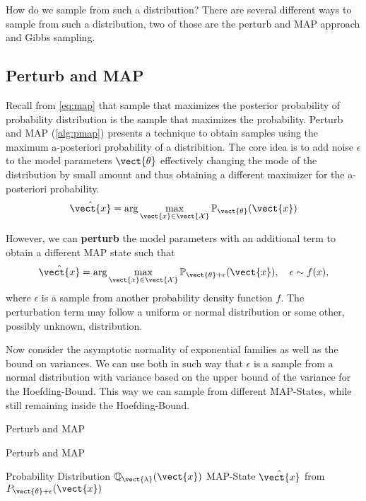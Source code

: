 How do we sample from such a distribution? There are several different ways to sample from such a distribution, two of those are the perturb and MAP approach and Gibbs sampling.


\subsection{Perturb and MAP}
\label{ssec:pmap}
Recall from \eq\ref{eq:map} that sample that maximizes the posterior probability of probability distribution is the sample that maximizes the probability.
Perturb and MAP (\alg\ref{alg:pmap}) presents a technique to obtain samples using the maximum a-posteriori probability of a distribition.
The core idea is to add noise $\epsilon$ to the model parameters $\vect{\theta}$ effectively changing the mode of the distribution by small amount and thus obtaining a different maximizer for the a-posteriori probability. 
\begin{equation}
    \hat{\vect{x}}  = \arg\max_{\vect{x} \in \vect{\mathcal{X}}} \mathbb{P}_{\vect{\theta}}(\vect{x})
\end{equation}

However, we can \textbf{perturb} the model parameters with an additional term to obtain a different MAP state such that 
\begin{equation}
    \hat{\vect{x}}  = \arg\max_{\vect{x} \in \vect{\mathcal{X}}} \mathbb{P}_{\vect{\theta} + \epsilon}(\vect{x}), \quad \epsilon \sim f(x),
\end{equation}
where $\epsilon$ is a sample from another probability density function $f$.
The perturbation term may follow a uniform or normal distribution or some other, possibly unknown, distribution.

Now consider the asymptotic normality of exponential families as well as the bound on variances. 
We can use both in such way that $\epsilon$ is a sample from a normal distribution with variance based on the upper bound of the variance for the Hoefding-Bound.
This way we can sample from different MAP-States, while still remaining inside the Hoefding-Bound.

\begin{algo}{Perturb and MAP~\cite{papandreou2011perturb}}
    \begin{algorithm}[H]
        \caption{Perturb and MAP}
        \begin{algorithmic}
            \label{alg:pmap}
            \REQUIRE Probability Distribution $\mathbb{Q}_{\vect{\lambda}}(\vect{x})$
            \ENSURE  MAP-State $\hat{\vect{x}}$ from $P_{\vect{\theta} + \epsilon}(\vect{x})$ \\
            \\
            \\
        \end{algorithmic}
    \end{algorithm}
\end{algo}

